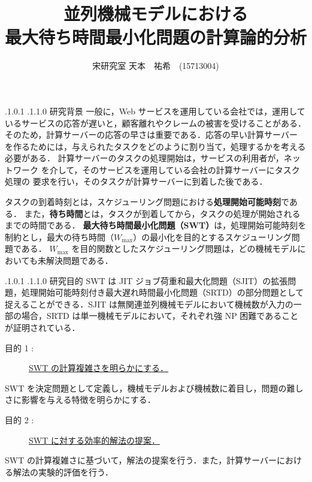 \documentclass[oneside, 10pt, twocolumn]{jarticle}
\title{\bf{\rm
並列機械モデルにおける\\最大待ち時間最小化問題の計算論的分析}}
\author{宋研究室
\hspace{15pt}
天本　祐希　(15713004)}
\date{}
\makeatletter
\def\section{\@startsection {section}{1}{\z@}{-3.5ex plus -1ex minus
-.2ex}{2.3 ex plus .2ex}{\large\bf}}
\renewcommand{\section}{
\@startsection{section}{1}{\z@}
{.1\Cvs \@plus.0\Cdp \@minus.1\Cdp}%
{.1\Cvs \@plus.1\Cdp \@minus.0\Cdp}%
{\reset@font\large\bfseries}}      %
\makeatother
\begin{document}
\maketitle
\thispagestyle{empty}
\section{研究背景}
一般に，Web サービスを運用している会社では，運用しているサービスの応答が遅いと，顧客離れやクレームの被害を受けることがある．
そのため，計算サーバーの応答の早さは重要である．応答の早い計算サーバー
を作るためには，与えられたタスクをどのように割り当て，処理するかを考える必要がある．
計算サーバーのタスクの処理開始は，サービスの利用者が，ネットワーク
を介して，そのサービスを運用している会社の計算サーバーにタスク処理の
要求を行い，そのタスクが計算サーバーに到着した後である．

タスクの到着時刻とは，スケジューリング問題における{\bf 処理開始可能時刻}である．
また，{\bf 待ち時間}とは，タスクが到着してから，タスクの処理が開始されるまでの時間である．
{\bf 最大待ち時間最小化問題（SWT）}は，処理開始可能時刻を制約とし，最大の待ち時間（\mbox{\boldmath $W_{\max}$}）の最小化を目的とするスケジューリング問題である．
$W_{\max}$ を目的関数としたスケジューリング問題は，どの機械モデルにおいても未解決問題である．


\section{研究目的}
SWT は JIT ジョブ荷重和最大化問題（SJIT）の拡張問題，処理開始可能時刻付き最大遅れ時間最小化問題（SRTD）の部分問題として捉えることができる．SJIT は無関連並列機械モデルにおいて機械数が入力の一部の場合，SRTD は単一機械モデルにおいて，それぞれ強 NP 困難であることが証明されている\cite{SJIT}\cite{SRTD}．
\begin{description}
  \item[目的 1 :]
  \underline{SWT の計算複雑さを明らかにする．}
\end{description}
SWT を決定問題として定義し，機械モデルおよび機械数に着目し，問題の難しさに影響を与える特徴を明らかにする．

\begin{description}
  \item[目的 2 :]
  \underline{SWT に対する効率的解法の提案．}
\end{description}
SWT の計算複雑さに基づいて，解法の提案を行う．また，計算サーバーにおける解法の実験的評価を行う．
\end{document}
